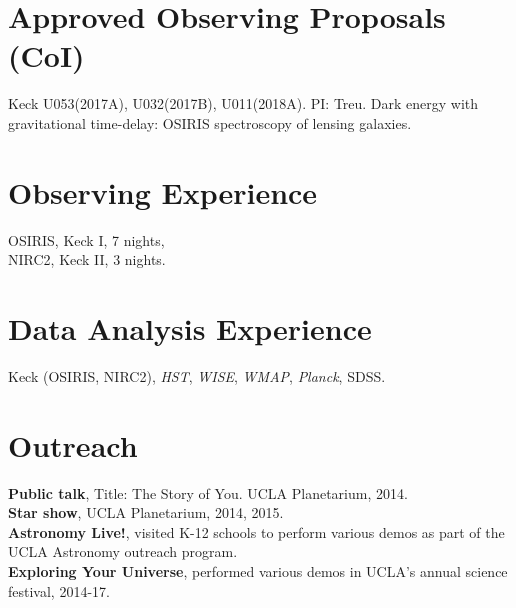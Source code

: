 \documentclass[margin,line]{res}
\begin{document}
\begin{resume}
\section{\sc Approved Observing Proposals (CoI)}
Keck U053(2017A), U032(2017B), U011(2018A). PI: Treu. Dark energy with gravitational time-delay: OSIRIS spectroscopy of lensing galaxies.\\

\section{\sc Observing Experience}
OSIRIS, Keck I, 7 nights,\\
NIRC2, Keck II, 3 nights. 

\section{\sc Data Analysis Experience} 
Keck (OSIRIS, NIRC2), {\it HST}, {\it WISE}, {\it WMAP}, {\it Planck}, SDSS. \\

\section{\sc Outreach}
{\bf Public talk}, Title: The Story of You. UCLA Planetarium, 2014. \\
{\bf Star show}, UCLA Planetarium, 2014, 2015. \\
{\bf Astronomy Live!}, visited K-12 schools to perform various demos as part of the UCLA Astronomy outreach program. \\
{\bf Exploring Your Universe}, performed various demos in UCLA's annual science festival, 2014-17.

%
%
%


\end{resume}
\end{document}
